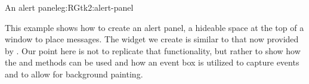 



\begin{example}{An alert panel}{eg:RGtk2:alert-panel}

This example shows how to create an alert panel, a hideable space at
the top of a window to place messages. The widget we create is similar
to that now provided by . Our point here is not
to replicate that functionality, but rather to show how the
 and  methods can be
used and how an event box is utilized to capture events and to allow
for background painting.


\end{example}

